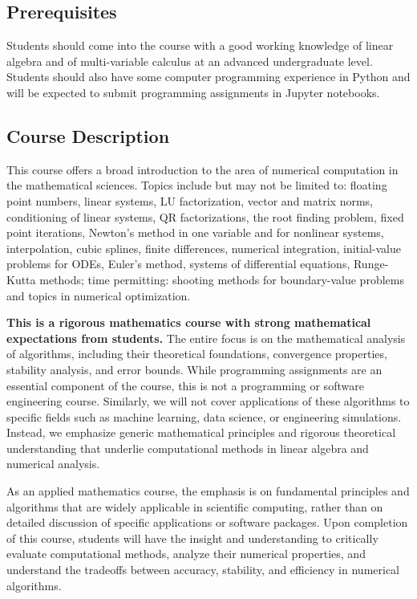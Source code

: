 \documentclass{article}
\begin{document}
\subsection{Prerequisites}

Students should come into the course with a good working knowledge of linear algebra and of multi-variable calculus at an advanced undergraduate level. Students should also have some computer programming experience in Python and will be expected to submit programming assignments in Jupyter notebooks.

\subsection{Course Description}


This course offers a broad introduction to the area of numerical computation in the
mathematical sciences. Topics include but may not be limited to: floating point numbers, linear
systems, LU factorization, vector and matrix norms, conditioning of linear systems, QR
factorizations, the root finding problem, fixed point iterations, Newton’s method in one variable
and for nonlinear systems, interpolation, cubic splines, finite differences, numerical integration,
initial-value problems for ODEs, Euler’s method, systems of differential equations, Runge-Kutta
methods; time permitting: shooting methods for boundary-value problems and topics in numerical
optimization.

\textbf{This is a rigorous mathematics course with strong mathematical expectations from students.} The entire focus is on the mathematical analysis of algorithms, including their theoretical foundations, convergence properties, stability analysis, and error bounds. While programming assignments are an essential component of the course, this is not a programming or software engineering course. Similarly, we will not cover applications of these algorithms to specific fields such as machine learning, data science, or engineering simulations. Instead, we emphasize generic mathematical principles and rigorous theoretical understanding that underlie computational methods in linear algebra and numerical analysis.

As an applied mathematics course, the emphasis is on fundamental principles and algorithms that are widely applicable in scientific computing, rather than on detailed discussion of specific applications or software packages. Upon completion of this course, students will have the insight and understanding to critically evaluate computational methods, analyze their numerical properties, and understand the tradeoffs between accuracy, stability, and efficiency in numerical algorithms.
\end{document}
